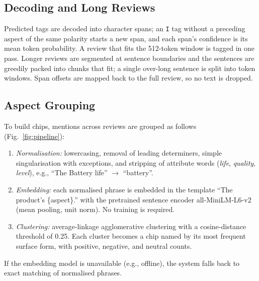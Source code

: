 \documentclass[conference]{IEEEtran}
\begin{document}
\subsection{Decoding and Long Reviews}
Predicted tags are decoded into character spans; an \texttt{I} tag without a preceding aspect of the same polarity starts a new span, and each span's confidence is its mean token probability. A review that fits the 512-token window is tagged in one pass. Longer reviews are segmented at sentence boundaries and the sentences are greedily packed into chunks that fit; a single over-long sentence is split into token windows. Span offsets are mapped back to the full review, so no text is dropped.

\subsection{Aspect Grouping}
To build chips, mentions across reviews are grouped as follows (Fig.~\ref{fig:pipeline}):
\begin{enumerate}
\item \emph{Normalisation:} lowercasing, removal of leading determiners, simple singularisation with exceptions, and stripping of attribute words (\emph{life}, \emph{quality}, \emph{level}), e.g., ``The Battery life'' $\rightarrow$ ``battery''.
\item \emph{Embedding:} each normalised phrase is embedded in the template ``The product's \{aspect\}.'' with the pretrained sentence encoder all-MiniLM-L6-v2~\cite{reimers2019sbert,wang2020minilm} (mean pooling, unit norm). No training is required.
\item \emph{Clustering:} average-linkage agglomerative clustering with a cosine-distance threshold of 0.25. Each cluster becomes a chip named by its most frequent surface form, with positive, negative, and neutral counts.
\end{enumerate}
If the embedding model is unavailable (e.g., offline), the system falls back to exact matching of normalised phrases.
\end{document}
